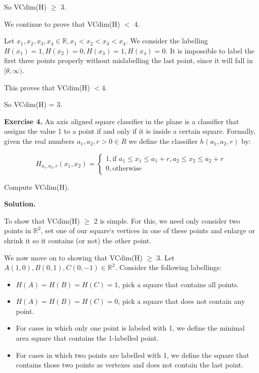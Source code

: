 \documentclass{article}
\newcommand{\<}{\langle}
\renewcommand{\>}{\rangle}
\theoremstyle{definition}
\begin{document}
So VCdim(H) $\geq$ 3.

We continue to prove that VCdim(H) $<$ 4.

Let $x_1, x_2, x_3, x_4 \in \mathbb{R}, x_1 < x_2 < x_3 < x_4$. We consider the labelling $H(x_1) = 1, H(x_2) = 0, H(x_3) = 1, H(x_4) = 0$. It is impossible to label the first three points properly without mislabelling the last point, since it will fall in $[\theta, \infty)$.

This proves that VCdim(H) $< 4$.

So VCdim(H) = 3.

\vspace{3mm}

\textbf{Exercise 4.} An axis aligned square classifier in the plane is a classifier that assigns the value 1 to a point if and only if it is inside a certain square. Formally, given the real numbers $a_1 , a_2 , r > 0 \in R$ we define the classifier $h (a_1, a_2, r)$ by:

$$H_{a_1, a_2, r} (x_1, x_2) = \begin{cases} 1, \text{if } a_1 \leq x_1 \leq a_1 + r, a_2 \leq x_2 \leq a_2 + r \\ 0, \text{otherwise} \end{cases}$$

Compute VCdim(H).

\textbf{Solution.}

To show that VCdim(H) $\geq$ 2 is simple. For this, we need only consider two points in $\mathbb{R}^2$, set one of our square`s vertices in one of these points and enlarge or shrink it so it contains (or not) the other point. 

We now move on to showing that VCdim(H) $\geq$ 3. Let $A(1, 0), B(0, 1) , C(0, -1) \in \mathbb{R}^2$. Consider the following labellings:

\begin{itemize}
    \item[] $H(A) = H(B) = H(C) = 1$, pick a square that contains all points.
    \item[] $H(A) = H(B) = H(C) = 0$, pick a square that does not contain any point.
    \item[] For cases in which only one point is labeled with 1, we define the minimal area square that contains the 1-labelled point.
    \item[] For cases in which two points are labelled with 1, we define the square that contains those two points as vertexes and does not contain the last point.
\end{itemize}
\end{document}
